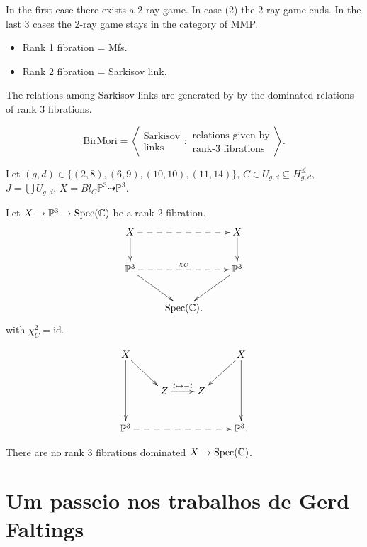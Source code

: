 In the first case there exists a 2-ray game.
In case (2) the 2-ray game ends.
In the last 3 cases the 2-ray game
stays in the category of MMP.

\begin{itemize}
\item Rank 1 fibration = Mfs.
\item Rank 2 fibration = Sarkisov link.
\end{itemize}

\begin{theorem}[BLZ]
\label{theorem-blz2}
The relations among Sarkisov links are
generated by
by the dominated relations of rank 3
fibrations.
\end{theorem}

$$
\text{BirMori}=
\left\langle{}
\substack{\text{Sarkisov} \\ \text{links}}
:\substack{\text{relations given by} \\
\text{rank-3 fibrations}}\right\rangle{}.
$$

Let $(g,d) \in
\{(2,8),(6,9),(10,10),(11,14)\}$,
$C \in U_{g,d}\subseteq H_{g,d}^{\leq}$,
$J=\bigcup U_{g,d}$,
$X=Bl_C \mathbb{P}^3 \dashrightarrow
\mathbb{P}^3$.

\begin{proposition}
\label{proposition-rank-2}
Let $X \to \mathbb{P}^3 \to
\mathop{\mathrm{Spec}}(\mathbb{C})$
be a rank-2 fibration.
$$
\xymatrix{
X\ar@{-->}[rr]\ar[d]
&&X\ar[d]\\
\ar[dr]\mathbb{P}^3\ar@{-->}[rr]^{\chi_C}
&&\mathbb{P}^3 \ar[dl]\\
&\Spec(\mathbb{C}).
}
$$
with $\chi_C^2=\text{id}$.
\end{proposition}

$$
\xymatrix{
X\ar[dd]\ar[dr]&&& X\ar[dl]\ar[dd]\\
&Z \ar[r]^{t \mapsto -t}& Z\\
\mathbb{P}^3 \ar@{-->}[rrr]&&&\mathbb{P}^3.
}
$$
\begin{proposition}
\label{proposition-no-rank-3}
There are no rank 3 fibrations
dominated $X \to \mathop{\mathrm{Spec}}(\mathbb{C})$.
\end{proposition}








\clearpage

\section{Um passeio nos trabalhos de
Gerd Faltings}
\label{section-faltings}

